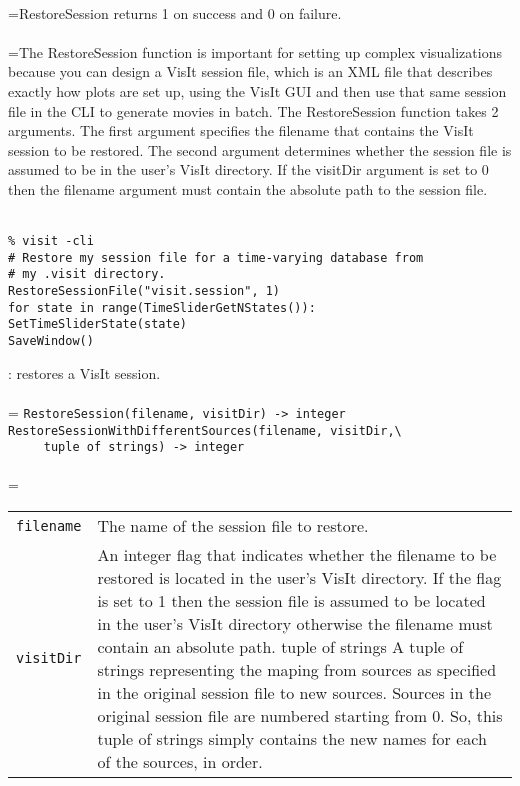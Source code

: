 \documentclass[10pt,a4paper]{report}
\begin{document}
 \\ 
\hangindent=\parindent RestoreSession returns 1 on success and 0 on failure. \\[-3mm] 

 \\ 
\hangindent=\parindent The RestoreSession function is important for setting up complex visualizations because you can design a VisIt session file, which is an XML file that describes exactly how plots are set up, using the VisIt GUI and then use that same session file in the CLI to generate movies in batch. The RestoreSession function takes 2 arguments. The first argument specifies the filename that contains the VisIt session to be restored. The second argument determines whether the session file is assumed to be in the user's VisIt directory. If the visitDir argument is set to 0 then the filename argument must contain the absolute path to the session file. \\[-3mm] 

\\[-6mm]
\begin{verbatim}% visit -cli
# Restore my session file for a time-varying database from 
# my .visit directory.
RestoreSessionFile("visit.session", 1)
for state in range(TimeSliderGetNStates()):
SetTimeSliderState(state)
SaveWindow()
\end{verbatim}
\newpage


{}
: restores a VisIt session.\\[-3mm]

 \\ 
\hangindent=\parindent 
\verb!RestoreSession(filename, visitDir) -> integer!\\
\verb!RestoreSessionWithDifferentSources(filename, visitDir,\ ! \\ 
\verb!     tuple of strings) -> integer!\\ [-3mm]

 \\ 
\hangindent=\parindent 
\begin{tabular}{lp{9cm}}
\verb!filename! & The name of the session file to restore. \\
\verb!visitDir! & An integer flag that indicates whether the filename to be restored is located in the user's VisIt directory. If the flag is set to 1 then the session file is assumed to be located in the user's VisIt directory otherwise the filename must contain an absolute path. tuple of strings A tuple of strings representing the maping from sources as specified in the original session file to new sources. Sources in the original session file are numbered starting from 0. So, this tuple of strings simply contains the new names for each of the sources, in order. \\
\end{tabular} \\[-2mm]
\end{document}
